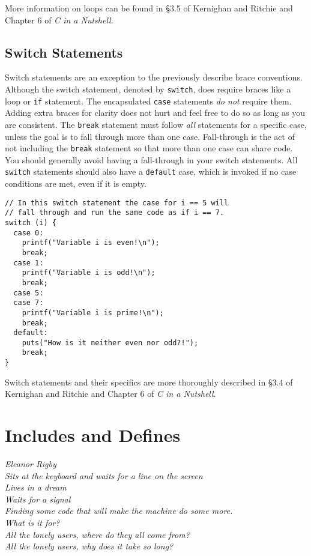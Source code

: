 \documentclass[11pt]{article}
\begin{document}
More information on loops can be found in \S 3.5 of Kernighan and Ritchie and Chapter 6 of \emph{C in a Nutshell}.

\subsection{Switch Statements}
Switch statements are an exception to the previously describe brace conventions.
Although the switch statement, denoted by \texttt{switch}, does
require braces like a loop or \texttt{if} statement. The encapsulated \texttt{case} statements
\emph{do not} require them. Adding extra
braces for clarity does not hurt and feel free to do so as long as you
are consistent. The \texttt{break} statement must follow \emph{all} statements for a
specific case, unless the goal is to fall through more than one case.
Fall-through is the act of not including the \texttt{break} statement so
that more than one case can share code. You should generally avoid having a
fall-through in your switch statements. All \texttt{switch} statements should also
have a \texttt{default} case, which is invoked if no case conditions are met,
even if it is empty.

\begin{lstlisting}
// In this switch statement the case for i == 5 will
// fall through and run the same code as if i == 7.
switch (i) {
  case 0:
    printf("Variable i is even!\n");
    break;
  case 1:
    printf("Variable i is odd!\n");
    break;
  case 5:
  case 7:
    printf("Variable i is prime!\n");
    break;
  default:
    puts("How is it neither even nor odd?!");
    break;
}
\end{lstlisting}

Switch statements and their specifics are more thoroughly described in \S 3.4 of
Kernighan and Ritchie and Chapter 6 of \emph{C in a Nutshell}.

\section{Includes and Defines}
\textwidth
\epigraph{\emph{Eleanor Rigby \\
Sits at the keyboard and waits for a line on the screen \\
Lives in a dream \\
Waits for a signal \\
Finding some code that will make the machine do some more.  \\
What is it for? \\
All the lonely users, where do they all come from? \\
All the lonely users, why does it take so long?}}{}
\end{document}
